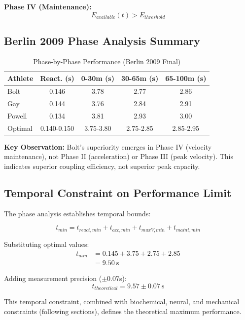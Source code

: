 \textbf{Phase IV (Maintenance):}
\begin{equation}
E_{available}(t) > E_{threshold}
\end{equation}

\subsection{Berlin 2009 Phase Analysis Summary}

\begin{table}[H]
\centering
\caption{Phase-by-Phase Performance (Berlin 2009 Final)}
\begin{tabular}{lcccc}
\toprule
Athlete & React. (s) & 0-30m (s) & 30-65m (s) & 65-100m (s) \\
\midrule
Bolt & 0.146 & 3.78 & 2.77 & 2.86 \\
Gay & 0.144 & 3.76 & 2.84 & 2.91 \\
Powell & 0.134 & 3.81 & 2.93 & 3.00 \\
\midrule
Optimal & 0.140-0.150 & 3.75-3.80 & 2.75-2.85 & 2.85-2.95 \\
\bottomrule
\end{tabular}
\end{table}

\textbf{Key Observation:} Bolt's superiority emerges in Phase IV (velocity maintenance), not Phase II (acceleration) or Phase III (peak velocity). This indicates superior coupling efficiency, not superior peak capacity.

\subsection{Temporal Constraint on Performance Limit}

The phase analysis establishes temporal bounds:

\begin{equation}
t_{min} = t_{react,min} + t_{acc,min} + t_{maxV,min} + t_{maint,min}
\label{eq:minimum_time}
\end{equation}

Substituting optimal values:
\begin{align}
t_{min} &= 0.145 + 3.75 + 2.75 + 2.85 \\
&= 9.50~\text{s}
\end{align}

Adding measurement precision ($\pm$0.07s):
\begin{equation}
\boxed{t_{theoretical} = 9.57 \pm 0.07~\text{s}}
\end{equation}

This temporal constraint, combined with biochemical, neural, and mechanical constraints (following sections), defines the theoretical maximum performance.
